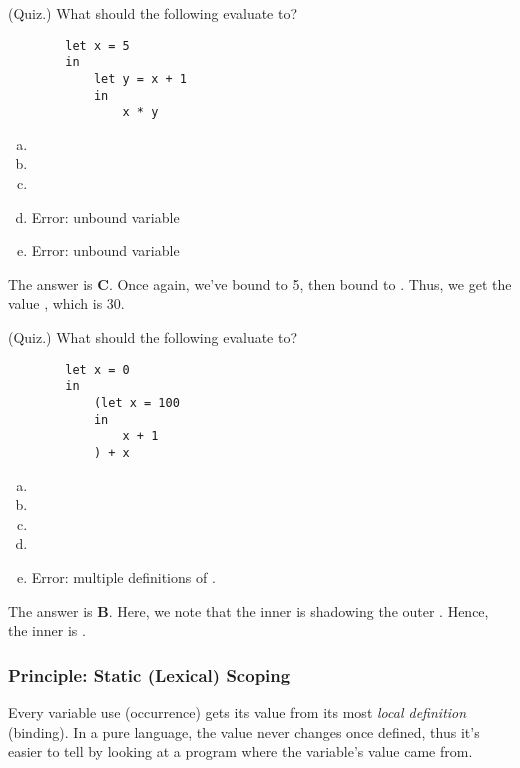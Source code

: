 \documentclass[letterpaper]{article}
\begin{document}
\begin{mdframed}[]
    (Quiz.) What should the following evaluate to? 
    \begin{verbatim}
        let x = 5
        in 
            let y = x + 1
            in 
                x * y \end{verbatim}
    \begin{enumerate}[(a)]
        \item {}
        \item {}
        \item {}
        \item Error: unbound variable 
        \item Error: unbound variable 
    \end{enumerate}

    \begin{mdframed}[]
        The answer is \textbf{C}. Once again, we've bound  to 5, then bound  to . Thus, we get the value , which is 30.
    \end{mdframed}
\end{mdframed}

\begin{mdframed}[]
    (Quiz.) What should the following evaluate to? 
    \begin{verbatim}
        let x = 0 
        in
            (let x = 100 
            in
                x + 1
            ) + x\end{verbatim}
    \begin{enumerate}[(a)]
        \item {}
        \item {}
        \item {}
        \item {}
        \item Error: multiple definitions of .
    \end{enumerate}

    \begin{mdframed}[]
        The answer is \textbf{B}. Here, we note that the inner  is shadowing the outer . Hence, the inner  is . 
    \end{mdframed}
\end{mdframed}

\subsubsection{Principle: Static (Lexical) Scoping}
Every variable use (occurrence) gets its value from its most \emph{local definition} (binding). In a pure language, the value never changes once defined, thus it's easier to tell by looking at a program where the variable's value came from. 
\end{document}
